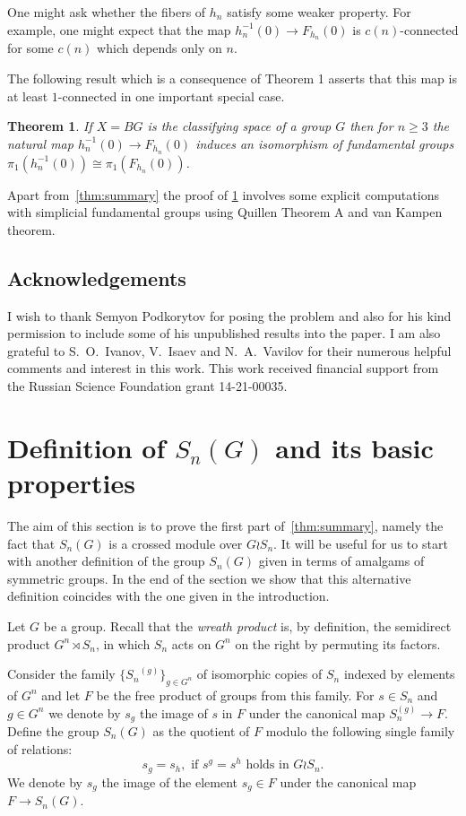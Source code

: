 \documentclass[oneside, 10pt]{amsart}
\theoremstyle{plain}
\newtheorem{thm}{Theorem}
\numberwithin{equation}{section}
\numberwithin{lemma}{section}
\theoremstyle{remark}
\theoremstyle{definition}
\begin{document}
One might ask whether the fibers of $h_n$ satisfy some weaker property.
For example, one might expect that the map $h_n^{-1}(0) \to F_{h_n}(0)$ is $c(n)$-connected for some $c(n)$ which depends only on $n$. %
  
The following result which is a consequence of Theorem 1 asserts that this map is at least $1$-connected in one important special case.
\begin{thm} \label{thm:main} If $X=BG$ is the classifying space of a group $G$ then for $n\geq 3$
 the natural map $h_n^{-1}(0) \to F_{h_n}(0)$ induces an isomorphism of fundamental groups
 $\pi_1(h^{-1}_n(0))\cong \pi_1(F_{h_n}(0))$. \end{thm}
Apart from~\cref{thm:summary} the proof of \cref{thm:main} involves some explicit computations with simplicial fundamental groups 
 using Quillen Theorem A and van Kampen theorem.

\subsection{Acknowledgements}
I wish to thank Semyon Podkorytov for posing the problem and also for his kind permission to include some of his unpublished results into the paper.
I am also grateful to S.~O.~Ivanov, V.~Isaev and N.~A.~Vavilov for their numerous helpful comments and interest in this work.
This work received financial support from the Russian Science Foundation grant 14-21-00035.

\section{Definition of $S_n(G)$ and its basic properties} \label{sec:QnG-def}
The aim of this section is to prove the first part of~\cref{thm:summary}, namely the fact that $S_n(G)$ is a crossed module over $G \wr S_n$.
It will be useful for us to start with another definition of the group $S_n(G)$ given in terms of amalgams of symmetric groups.
In the end of the section we show that this alternative definition coincides with the one given in the introduction.

Let $G$ be a group. Recall that the {\it wreath product} is, by definition,
the semidirect product $G^n \rtimes S_n$, in which $S_n$ acts on $G^n$ on the right by permuting its factors.

Consider the family $\{{S_n}^{(g)}\}_{g\in G^n}$ of isomorphic copies of $S_n$ indexed by elements of $G^n$ and let $F$ be the free product of groups from this family.
For $s\in S_n$ and $g\in G^n$ we denote by 
$s_{g}$ the image of $s$ in $F$ under the canonical map $S_n^{(g)} \to F$.
Define the group $S_n(G)$ as the quotient of $F$ modulo the following single family of relations:
\begin{equation} \label{eq:main_rel} s_{g} = s_{h}, \text{ if $s^g = s^h$ holds in $G \wr S_n$.} \end{equation}
We denote by $s_g$ the image of the element $s_g\in F$ under the canonical map $F\to S_n(G)$.
\end{document}
